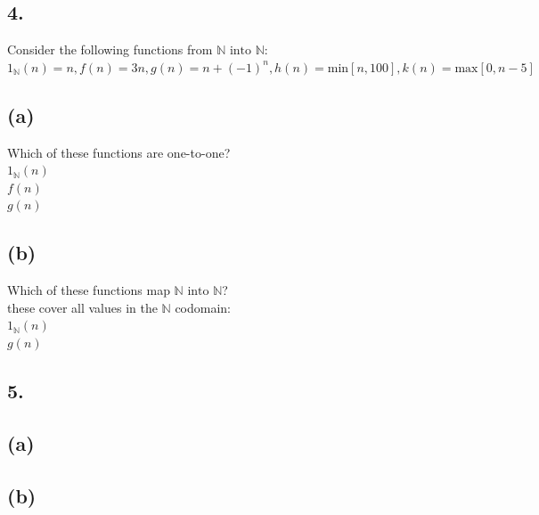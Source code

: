 \documentclass[11pt]{article}
\begin{document}
\subsection*{4.}
\begin{center}
Consider the following functions from $\mathbb{N} \text{ into } \mathbb{N}$:\\
$1_{\mathbb{N}}(n) = n, f(n) = 3n, g(n) = n + (-1)^{n}, h(n) = \text{min}[n, 100], k(n) = \text{max}[0, n - 5]$
\end{center}

\subsection*{(a)}
\begin{center}
Which of these functions are one-to-one?\\
\hfill \break
$1_{\mathbb{N}}(n)$\\
$f(n)$\\
$g(n)$
\end{center}

\subsection*{(b)}
\begin{center}
Which of these functions map $\mathbb{N} \text{ into } \mathbb{N}$?\\
\hfill \break
these cover all values in the $\mathbb{N}$ codomain:\\
$1_{\mathbb{N}}(n)$\\
$g(n)$
\end{center}
%
%
\subsection*{5.}
\begin{center}

\end{center}

\subsection*{(a)}
\begin{center}

\hfill \break

\end{center}

\subsection*{(b)}
\begin{center}

\hfill \break

\end{center}
\end{document}
